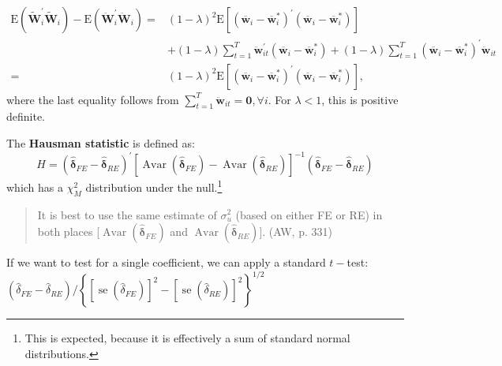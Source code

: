 \documentclass[11pt, a4paper]{report}
\theoremstyle{plain}
\theoremstyle{plain}
\theoremstyle{remark}
\begin{document}
\begin{equation}
    \begin{aligned}
    \mathrm{E}\left(\tilde{\mathbf{W}}_{i}^{\prime} \tilde{\mathbf{W}}_{i}\right)-\mathrm{E}\left(\ddot{\mathbf{W}}_{i}^{\prime} \ddot{\mathbf{W}}_{i}\right)=&(1-\lambda)^{2} \mathrm{E}\left[\left(\overline{\mathbf{w}}_{i}-\overline{\mathbf{w}}_{i}^{*}\right)^{\prime}\left(\overline{\mathbf{w}}_{i}-\overline{\mathbf{w}}_{i}^{*}\right)\right] \\
    &+(1-\lambda) \sum_{t=1}^{T} \ddot{\mathbf{w}}_{i t}^{\prime}\left(\overline{\mathbf{w}}_{i}-\overline{\mathbf{w}}_{i}^{*}\right)+(1-\lambda) \sum_{t=1}^{T}\left(\overline{\mathbf{w}}_{i}-\overline{\mathbf{w}}_{i}^{*}\right)^{\prime} \ddot{\mathbf{w}}_{i t} \\
    =&(1-\lambda)^{2} \mathrm{E}\left[\left(\overline{\mathbf{w}}_{i}-\overline{\mathbf{w}}_{i}^{*}\right)^{\prime}\left(\overline{\mathbf{w}}_{i}-\overline{\mathbf{w}}_{i}^{*}\right)\right],
    \end{aligned}
\end{equation}
where the last equality follows from $\sum_{t=1}^{T} \ddot{\mathbf{w}}_{i t}=\mathbf{0}, \forall i$. For $\lambda < 1$, this is positive definite. 

The \textbf{Hausman statistic} is defined as:
\begin{equation}
    H=\left(\hat{\boldsymbol{\delta}}_{F E}-\hat{\boldsymbol{\delta}}_{R E}\right)^{\prime}\left[\operatorname{Avar}\left(\hat{\boldsymbol{\delta}}_{F E}\right)-\operatorname{Avar}\left(\hat{\boldsymbol{\delta}}_{R E}\right)\right]^{-1}\left(\hat{\boldsymbol{\delta}}_{F E}-\hat{\boldsymbol{\delta}}_{R E}\right)
 \end{equation}
 which has a $\chi_M^2$ distribution under the null.\footnote{This is expected, because it is effectively a sum of standard normal distributions.} 

 \begin{quote}
    It is best to use the same estimate of $\sigma_u^2$ (based on either FE
    or RE) in both places [$\operatorname{Avar}\left(\hat{\boldsymbol{\delta}}_{F E}\right)$ and $\operatorname{Avar}\left(\hat{\boldsymbol{\delta}}_{R E}\right)$]. (AW, p. 331)
 \end{quote}

If we want to test for a single coefficient, we can apply a standard $t-$test: $\left(\hat{\delta}_{F E}-\hat{\delta}_{R E}\right) /\left\{\left[\operatorname{se}\left(\hat{\delta}_{F E}\right)\right]^{2}-\left[\operatorname{se}\left(\hat{\delta}_{R E}\right)\right]^{2}\right\}^{1 / 2}$
\end{document}
